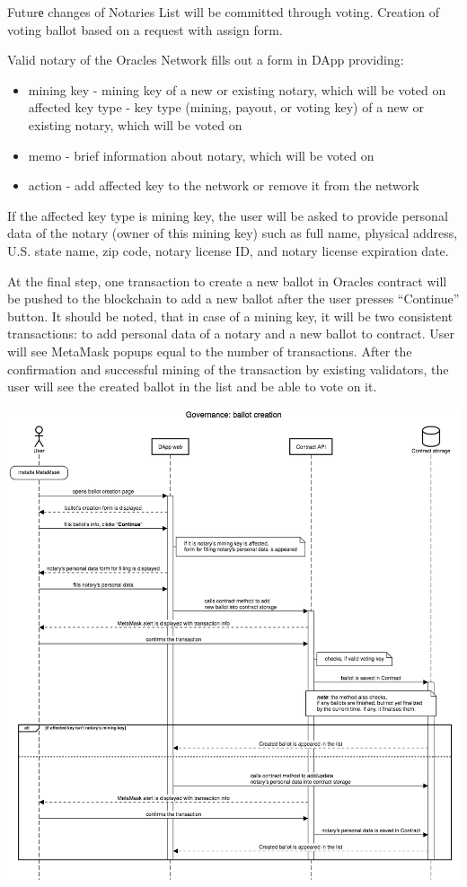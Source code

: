 \documentclass[12pt]{report}
\begin{document}
\begin{multicols}{2}
Futurе changes of Notaries List will be committed through voting. Creation of voting ballot based on a request with assign form.

Valid notary of the Oracles Network fills out a form in DApp providing:
\begin{itemize}
	\item mining key - mining key of a new or existing notary, which will be voted on
affected key type - key type (mining, payout, or voting key) of a new or existing notary, which will be voted on
	\item memo - brief information about notary, which will be voted on
	\item action - add affected key to the network or remove it from the network
\end{itemize}

If the affected key type is mining key, the user will be asked to provide personal data of the notary (owner of this mining key) such as full name, physical address, U.S. state name, zip code, notary license ID, and notary license expiration date.

At the final step, one transaction to create a new ballot in Oracles contract will be pushed to the blockchain to add a new ballot after the user presses “Continue” button. It should be noted, that in case of a mining key, it will be two consistent transactions: to add personal data of a notary and a new ballot to contract. User will see MetaMask popups equal to the number of transactions. After the confirmation and successful mining of the transaction by existing validators, the user will see the created ballot in the list and be able to vote on it. 
\end{multicols}

\includegraphics[width=\textwidth]{creation-ballot}
\end{document}
